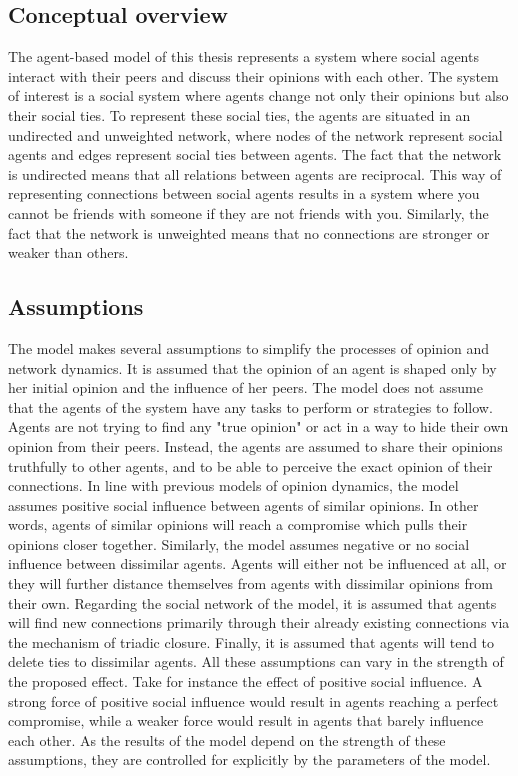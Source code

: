 \documentclass[11pt]{article}
\begin{document}
\subsection{Conceptual overview}
The agent-based model of this thesis represents a system where social agents interact with their peers and discuss their opinions with each other. The system of interest is a social system where agents change not only their opinions but also their social ties. To represent these social ties, the agents are situated in an undirected and unweighted network, where nodes of the network represent social agents and edges represent social ties between agents. The fact that the network is undirected means that all relations between agents are reciprocal. This way of representing connections between social agents results in a system where you cannot be friends with someone if they are not friends with you. Similarly, the fact that the network is unweighted means that no connections are stronger or weaker than others. 


\subsection{Assumptions}
The model makes several assumptions to simplify the processes of opinion and network dynamics. It is assumed that the opinion of an agent is shaped only by her initial opinion and the influence of her peers. 
The model does not assume that the agents of the system have any tasks to perform or strategies to follow. Agents are not trying to find any "true opinion" or act in a way to hide their own opinion from their peers. Instead, the agents are assumed to share their opinions truthfully to other agents, and to be able to perceive the exact opinion of their connections. 
In line with previous models of opinion dynamics, the model assumes positive social influence between agents of similar opinions. In other words, agents of similar opinions will reach a compromise which pulls their opinions closer together. Similarly, the model assumes negative or no social influence between dissimilar agents. Agents will either not be influenced at all, or they will further distance themselves from agents with dissimilar opinions from their own. Regarding the social network of the model, it is assumed that agents will find new connections primarily through their already existing connections via the mechanism of triadic closure. Finally, it is assumed that agents will tend to delete ties to dissimilar agents.
All these assumptions can vary in the strength of the proposed effect. Take for instance the effect of positive social influence. A strong force of positive social influence would result in agents reaching a perfect compromise, while a weaker force would result in agents that barely influence each other. 
As the results of the model depend on the strength of these assumptions, they are controlled for explicitly by the parameters of the model. 
\end{document}
